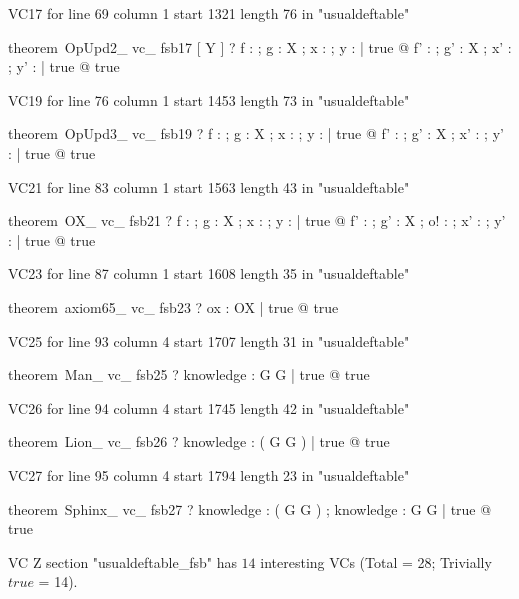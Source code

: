 \documentclass{article}
\begin{document}
VC17 for line 69 column 1 start 1321 length 76 in "usualdeftable"
\begin{zed}
theorem~OpUpd2\_ vc\_ fsb17 [ Y ] \vdash ? \forall f : \nat \fun \nat ; g : X ; x : \nat ; y : \power \nat | true @ \exists f' : \nat \fun \nat ; g' : X ; x' : \nat ; y' : \power \nat | true @ true
\end{zed}

VC19 for line 76 column 1 start 1453 length 73 in "usualdeftable"
\begin{zed}
theorem~OpUpd3\_ vc\_ fsb19 \vdash ? \forall f : \nat \fun \nat ; g : X ; x : \nat ; y : \power \nat | true @ \exists f' : \nat \fun \nat ; g' : X ; x' : \nat ; y' : \power \nat | true @ true
\end{zed}

VC21 for line 83 column 1 start 1563 length 43 in "usualdeftable"
\begin{zed}
theorem~OX\_ vc\_ fsb21 \vdash ? \forall f : \nat \fun \nat ; g : X ; x : \nat ; y : \power \nat | true @ \exists f' : \nat \fun \nat ; g' : X ; o! : \nat ; x' : \nat ; y' : \power \nat | true @ true
\end{zed}

VC23 for line 87 column 1 start 1608 length 35 in "usualdeftable"
\begin{zed}
theorem~axiom65\_ vc\_ fsb23 \vdash ? \exists ox : OX | true @ true
\end{zed}

VC25 for line 93 column 4 start 1707 length 31 in "usualdeftable"
\begin{zed}
theorem~Man\_ vc\_ fsb25 \vdash ? \exists knowledge : G \fun G | true @ true
\end{zed}

VC26 for line 94 column 4 start 1745 length 42 in "usualdeftable"
\begin{zed}
theorem~Lion\_ vc\_ fsb26 \vdash ? \exists knowledge : \power ( G \cross G ) | true @ true
\end{zed}

VC27 for line 95 column 4 start 1794 length 23 in "usualdeftable"
\begin{zed}
theorem~Sphinx\_ vc\_ fsb27 \vdash ? \exists knowledge : \power ( G \cross G ) ; knowledge : G \fun G | true @ true
\end{zed}



 VC Z section "usualdeftable_fsb" has $14$ interesting VCs (Total = 28; Trivially $true$ = 14).



\end{document}
